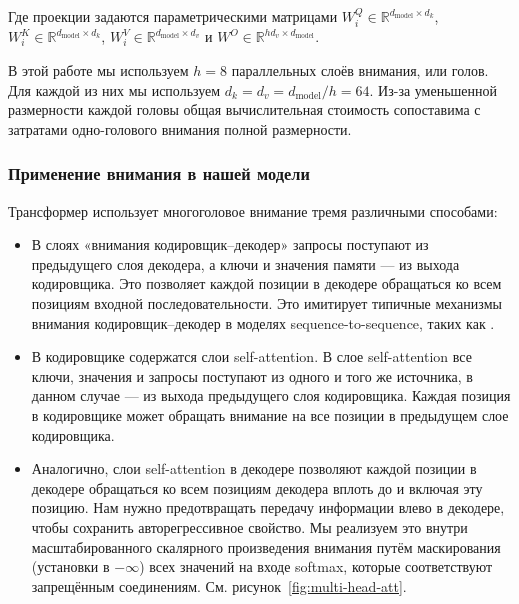 \documentclass{article}
\newcommand{\dmodel}{d_{\text{model}}}
\begin{document}
Где проекции задаются параметрическими матрицами $W^Q_i \in \mathbb{R}^{\dmodel \times d_k}$, $W^K_i \in \mathbb{R}^{\dmodel \times d_k}$, $W^V_i \in \mathbb{R}^{\dmodel \times d_v}$ и $W^O \in \mathbb{R}^{hd_v \times \dmodel}$.


В этой работе мы используем $h=8$ параллельных слоёв внимания, или голов. Для каждой из них мы используем $d_k=d_v=\dmodel/h=64$.
Из-за уменьшенной размерности каждой головы общая вычислительная стоимость сопоставима с затратами одно-голового внимания полной размерности.

\subsubsection{Применение внимания в нашей модели}

Трансформер использует многоголовое внимание тремя различными способами: 
\begin{itemize}
 \item В слоях «внимания кодировщик–декодер» запросы поступают из предыдущего слоя декодера, а ключи и значения памяти — из выхода кодировщика. Это позволяет каждой позиции в декодере обращаться ко всем позициям входной последовательности. Это имитирует типичные механизмы внимания кодировщик–декодер в моделях sequence-to-sequence, таких как \citep{wu2016google, bahdanau2014neural,JonasFaceNet2017}.

 \item В кодировщике содержатся слои self-attention. В слое self-attention все ключи, значения и запросы поступают из одного и того же источника, в данном случае — из выхода предыдущего слоя кодировщика. Каждая позиция в кодировщике может обращать внимание на все позиции в предыдущем слое кодировщика.

 \item Аналогично, слои self-attention в декодере позволяют каждой позиции в декодере обращаться ко всем позициям декодера вплоть до и включая эту позицию. Нам нужно предотвращать передачу информации влево в декодере, чтобы сохранить авторегрессивное свойство. Мы реализуем это внутри масштабированного скалярного произведения внимания путём маскирования (установки в $-\infty$) всех значений на входе softmax, которые соответствуют запрещённым соединениям. См. рисунок~\ref{fig:multi-head-att}.

\end{itemize}
\end{document}
